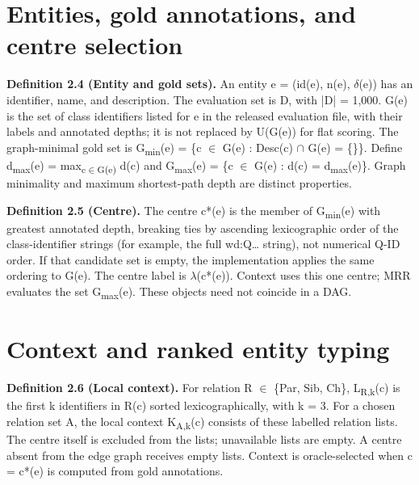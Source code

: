\FloatBarrier

\section{Entities, gold annotations, and centre selection}

{\small \textbf{Definition 2.4 (Entity and gold sets).} An entity e = (id(e), n(e), \ensuremath{\delta}(e)) has an identifier, name, and description. The evaluation set is D, with |D| = 1,000. G(e) is the set of class identifiers listed for e in the released evaluation file, with their labels and annotated depths; it is not replaced by U(G(e)) for flat scoring. The graph-minimal gold set is G\textsubscript{min}(e) = \{c \ensuremath{\in} G(e) : Desc(c) \ensuremath{\cap} G(e) = \{\}\}. Define d\textsubscript{max}(e) = max\textsubscript{c\ensuremath{\in}G(e)} d(c) and G\textsubscript{max}(e) = \{c \ensuremath{\in} G(e) : d(c) = d\textsubscript{max}(e)\}. Graph minimality and maximum shortest-path depth are distinct properties.\par}


{\small \textbf{Definition 2.5 (Centre).} The centre c*(e) is the member of G\textsubscript{min}(e) with greatest annotated depth, breaking ties by ascending lexicographic order of the class-identifier strings (for example, the full wd:Q… string), not numerical Q-ID order. If that candidate set is empty, the implementation applies the same ordering to G(e). The centre label is \ensuremath{\lambda}(c*(e)). Context uses this one centre; MRR evaluates the set G\textsubscript{max}(e). These objects need not coincide in a DAG.\par}


\FloatBarrier

\section{Context and ranked entity typing}

{\small \textbf{Definition 2.6 (Local context).} For relation R \ensuremath{\in} \{Par, Sib, Ch\}, L\textsubscript{R,k}(c) is the first k identifiers in R(c) sorted lexicographically, with k = 3. For a chosen relation set A, the local context K\textsubscript{A,k}(c) consists of these labelled relation lists. The centre itself is excluded from the lists; unavailable lists are empty. A centre absent from the edge graph receives empty lists. Context is oracle-selected when c = c*(e) is computed from gold annotations.\par}


